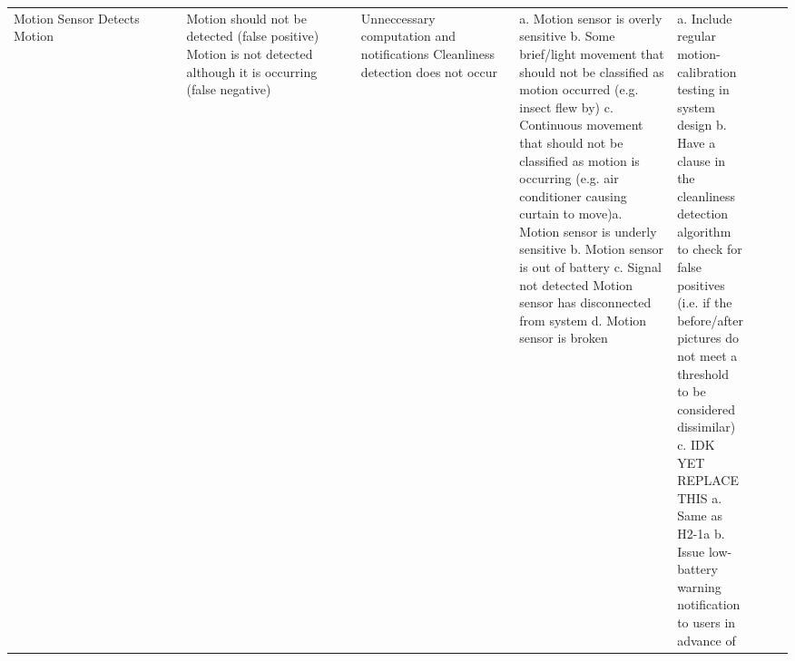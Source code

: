 \documentclass{article}
\begin{document}
\begin{table}[H]
\begin{adjustbox}{width=\textwidth}
\begin{tabular}{|p{0.25\linewidth} | p{0.25\linewidth} | p{0.22\linewidth}|  p{0.22\linewidth}|  p{0.30\linewidth}|  p{0.085\linewidth}|  p{0.05\linewidth}|p{0.12\linewidth}| }
         Motion Sensor Detects Motion  & Motion should not be detected (false positive) \newline\newline\newline\newline\newline\newline\newline\newline\newline\newline\newline\newline\newline\newline Motion is not detected although it is occurring (false negative) & Unneccessary computation and notifications \newline\newline\newline\newline\newline\newline\newline\newline\newline\newline\newline\newline\newline\newline Cleanliness detection does not occur & a. Motion sensor is overly sensitive \newline b. Some brief/light movement that should not be classified as motion occurred (e.g. insect flew by) \newline c. Continuous movement that should not be classified as motion is occurring (e.g. air conditioner causing curtain to move)\newline\newline a. Motion sensor is underly sensitive \newline b. Motion sensor is out of battery \newline c. Signal not detected Motion sensor has disconnected from system \newline d. Motion sensor is broken & a. Include regular motion-calibration testing in system design \newline b. Have a clause in the cleanliness detection algorithm to check for false positives (i.e. if the before/after pictures do not meet a threshold to be considered dissimilar) \newline c. IDK YET REPLACE THIS \newline\newline\newline\newline\newline a. Same as H2-1a \newline b. Issue low-battery warning notification to users in advance of 
\end{tabular}
\end{adjustbox}
\end{table}
\end{document}
